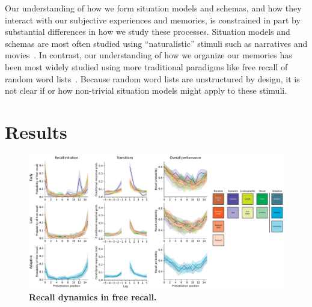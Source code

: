 \documentclass[10pt]{article}
\begin{document}

Our understanding of how we form situation models and schemas, and how they
interact with our subjective experiences and memories, is constrained in
part by substantial differences in how we study these processes.  Situation models
and schemas are most often studied using ``naturalistic'' 
stimuli such as narratives and movies~\citep{CITES}.  In contrast, our
understanding of how we organize our memories has been most widely studied
using more traditional paradigms like free recall of random word lists~\citep{Kaha12}.
Because random word lists are unstructured by design, it is not clear if or how non-trivial
situation models might apply to these stimuli.



\section*{Results}

\begin{figure}[tp]
    \centering
    \includegraphics[width=\textwidth]{figures/recall_dynamics}
    \caption{\textbf{Recall dynamics in free recall.}}
    \label{fig:recall-dynamics}
\end{figure}


\end{document}
